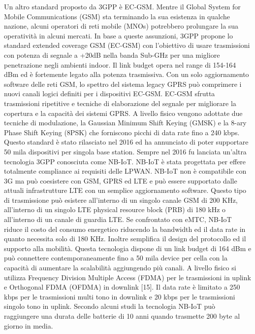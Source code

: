 \documentclass[12pt,a4paper,openright,twoside]{report}
\begin{document}
Un altro standard proposto da 3GPP \`e EC-GSM. Mentre il Global System for Mobile Communications (GSM) sta terminando la sua esistenza in qualche nazione, alcuni operatori di reti mobile (MNOs) potrebbero prolungare la sua operativit\`a in alcuni mercati. In base a queste assunzioni, 3GPP propone lo standard extended coverage GSM (EC-GSM) con l'obiettivo di usare trasmissioni con potenza di segnale a +20dB nella banda Sub-GHz per una migliore penetrazione negli ambienti indoor. 
Il link budget opera nel range di 154-164 dBm ed \`e fortemente legato alla potenza trasmissiva. 
Con un solo aggiornamento software delle reti GSM, lo spettro del sistema legacy GPRS pu\`o comprimere i nuovi canali logici definiti per i dispositivi EC-GSM. 
EC-GSM sfrutta trasmissioni ripetitive e tecniche di elaborazione del segnale per migliorare la copertura e la capacit\`a dei sistemi GPRS. 
A livello fisico vengono adottate due tecniche di modulazione, la  Gaussian Minimum Shift Keying (GMSK) e la  8-ary Phase Shift Keying (8PSK)  che forniscono picchi di data rate fino a 240 kbps.
Questo standard \`e stato rilasciato nel 2016 ed ha annunciato di poter supportare 50 mila dispositivi per singola base station. 
Sempre nel 2016 fu lanciata un'altra tecnologia 3GPP conosciuta come NB-IoT. NB-IoT \`e stata progettata per effere totalmente compliance ai requisiti delle LPWAN.
NB-IoT non \`e compatibile con 3G ma pu\`o coesistere con GSM, GPRS ed LTE e pu\`o essere supportato dalle attuali infrastrutture LTE con un semplice aggiornamento software. 
Questo tipo di trasmissione pu\`o esistere all'interno di un singolo canale GSM di 200 KHz, all'interno di un singolo LTE physical resource block (PRB) di 180 kHz o all'interno di un canale di guardia LTE.
Se confrontato con eMTC, NB-IoT riduce il costo del consumo energetico riducendo la bandwidth ed il data rate in quanto necessita solo di 180 KHz. 
Inoltre semplifica il design del protocollo ed il supporto alla mobilit\`a. Questa tecnologia dispone di un link budget di 164 dBm e pu\`o connettere contemporaneamente fino a 50 mila device per cella con la capacit\`a di aumentare la scalabilit\`a aggiungendo pi\`u canali. 
A livello fisico si utilizza Frequency Division Multiple Access (FDMA) per le trasmissioni in uplink e Orthogonal FDMA (OFDMA) in downlink [15]. 
Il data rate \`e limitato a 250 kbps per le trasmissioni multi tono in downlink e 20 kbps per le trasmissioni singolo tono in uplink. Secondo alcuni studi la tecnologia NB-IoT pu\`o raggiungere una durata delle batterie di 10 anni quando trasmette 200 byte al giorno in media.   
\end{document}
